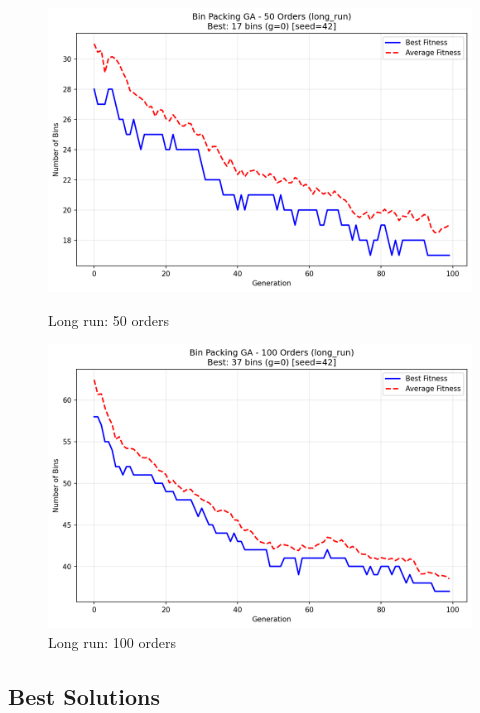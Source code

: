 \documentclass[journal,12pt,onecolumn]{IEEEtran}
\begin{document}
\begin{figure}[htbp]
\begin{minipage}{0.48\textwidth}
    \centering
    \includegraphics[width=\textwidth]{bpp_50items_long_run_seed42.png}
    \caption{Long run: 50 orders}
    \label{fig:long_run_50}
\end{minipage}\hfill
\begin{minipage}{0.48\textwidth}
    \centering
    \includegraphics[width=\textwidth]{bpp_100items_long_run_seed42.png}
    \caption{Long run: 100 orders}
    \label{fig:long_run_100}
\end{minipage}
\end{figure}

\subsection{Best Solutions}
\end{document}
